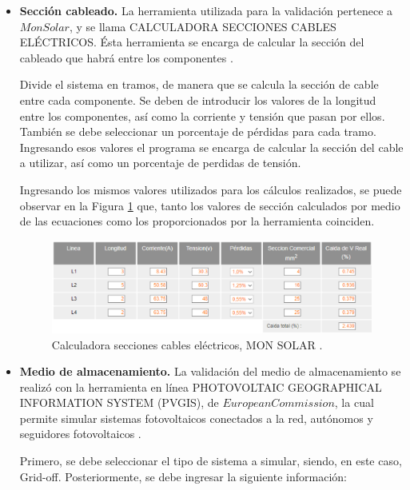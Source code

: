 \begin{itemize}
	\item \textbf{Sección cableado.}
	La herramienta utilizada para la validación pertenece a $ Mon Solar $, y se llama CALCULADORA SECCIONES CABLES ELÉCTRICOS. Ésta herramienta se encarga de calcular la sección del cableado que habrá entre los componentes \cite{DDE10}. 
	
	Divide el sistema en tramos, de manera que se calcula la sección de cable entre cada componente. Se deben de introducir los valores de la longitud entre los componentes, así como la corriente y tensión que pasan por ellos. También se debe seleccionar un porcentaje de pérdidas para cada tramo. Ingresando esos valores el programa se encarga de calcular la sección del cable a utilizar, así como un porcentaje de perdidas de tensión.
	
	Ingresando los mismos valores utilizados para los cálculos realizados, se puede observar en la Figura \ref{fig:cableadoval} que, tanto los valores de sección calculados por medio de las ecuaciones como los proporcionados por la herramienta coinciden.
		
	\begin{figure}[H]
		\centering
		\includegraphics[width=12cm]{imagenes/cableadoval}
		\caption{Calculadora secciones cables eléctricos, MON SOLAR \cite{DDE10}.}
		\label{fig:cableadoval}
	\end{figure}
	
	\item \textbf{Medio de almacenamiento.}
	La validación del medio de almacenamiento se realizó con la herramienta en línea PHOTOVOLTAIC GEOGRAPHICAL INFORMATION SYSTEM (PVGIS), de $ European Commission $, la cual permite simular sistemas fotovoltaicos conectados a la red, autónomos y seguidores fotovoltaicos \cite{DDE11}.
	
	Primero, se debe seleccionar el tipo de sistema a simular, siendo, en este caso, Grid-off. Posteriormente, se debe ingresar la siguiente información:
	

\end{itemize}
